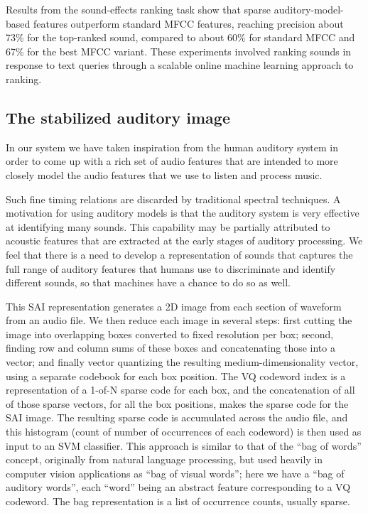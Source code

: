 Results from the sound-effects ranking task show
that sparse auditory-model-based features outperform standard MFCC
features, reaching precision about 73\% for the top-ranked sound,
compared to about 60\% for standard MFCC and 67\% for the best MFCC
variant.  These experiments involved ranking sounds in response to
text queries through a scalable online machine learning approach to
ranking.

\subsection{The stabilized auditory image}

In our system we have taken inspiration from the human auditory system
in order to come up with a rich set of audio features that are
intended to more closely model the audio features that we use to
listen and process music.  

Such fine timing relations are discarded by traditional
spectral techniques.  A motivation for using auditory models is that
the auditory system is very effective at identifying many sounds.
This capability may be partially attributed to acoustic features that are
extracted at the early stages of auditory processing.  We feel that
there is a need to develop a representation of sounds that captures
the full range of auditory features that humans use to discriminate
and identify different sounds, so that machines have a chance to do so
as well.  

This SAI representation generates a 2D image from each section of
waveform from an audio file.  We then reduce each image in several
steps: first cutting the image into overlapping boxes converted to
fixed resolution per box; second, finding row and column sums of these
boxes and concatenating those into a vector; and finally vector
quantizing the resulting medium-dimensionality vector, using a
separate codebook for each box position.  The VQ codeword index is a
representation of a 1-of-N sparse code for each box, and the
concatenation of all of those sparse vectors, for all the box
positions, makes the sparse code for the SAI image.  The resulting
sparse code is accumulated across the audio file, and this histogram
(count of number of occurrences of each codeword) is then used as
input to an SVM \cite{yh05} classifier\cite{chapelle2006}.  This
approach is similar to that of the ``bag of words'' concept,
originally from natural language processing, but used heavily in
computer vision applications as ``bag of visual words''; here we have
a ``bag of auditory words'', each ``word'' being an abstract feature
corresponding to a VQ codeword.  The bag representation is a list of
occurrence counts, usually sparse.



